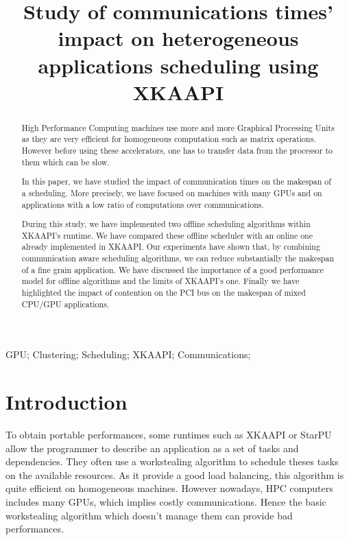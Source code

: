 \documentclass[10pt, conference, compsocconf,pdftex,dvipsnames]{IEEEtran}
\author{\IEEEauthorblockN{David Beniamine, Guillaume Huard}
    \IEEEauthorblockA{
        Université Joseph Fourier\\
        Laboratoire d'Informatique de Grenoble - Inria\\
        38330 Montbonnot St Martin, France\\
    david.beniamine@imag.fr, guillaume.huard@imag.fr}
}
\title{Study of communications times' impact on heterogeneous
applications scheduling using XKAAPI }
\begin{document}


\maketitle%
\begin{abstract}
    High Performance Computing machines use more and more Graphical Processing
    Units as they are very efficient for homogeneous computation such as
    matrix operations. However before using these accelerators, one has to
    transfer data from the processor to them which can be slow. 

    In this paper, we have studied the impact of communication times on the
    makespan of a scheduling.  More precisely, we have focused on machines
    with many GPUs and on applications with a low ratio of computations over
    communications. 

    During this study, we have implemented two offline scheduling algorithms
    within  XKAAPI's runtime. We have compared these offline scheduler with an
    online one already implemented in XKAAPI. Our experiments have shown that,
    by combining communication aware scheduling algorithms, we can reduce
    substantially the makespan of a fine grain application. We have discussed
    the importance of a good performance model for offline algorithms and the
    limits of XKAAPI's one. Finally we have highlighted the impact of
    contention on the PCI bus on the makespan of mixed CPU/GPU applications. 

\end{abstract}

\begin{IEEEkeywords}
    GPU; Clustering; Scheduling; XKAAPI; Communications;

\end{IEEEkeywords}




\section{Introduction}

To obtain portable performances, some runtimes such as XKAAPI
\cite{gautierxkaapi} or StarPU \cite{augonnet2011starpu} allow the programmer
to describe an application as a set of tasks and dependencies.  They often use
a workstealing algorithm \cite{blumofe1995cilk} to schedule theses tasks on
the available resources. As it provide a good load balancing, this algorithm
is quite efficient on homogeneous machines. However nowadays, HPC computers
includes many GPUs, which implies  costly communications. Hence the basic
workstealing algorithm which doesn't manage them can provide bad performances.
\end{document}
